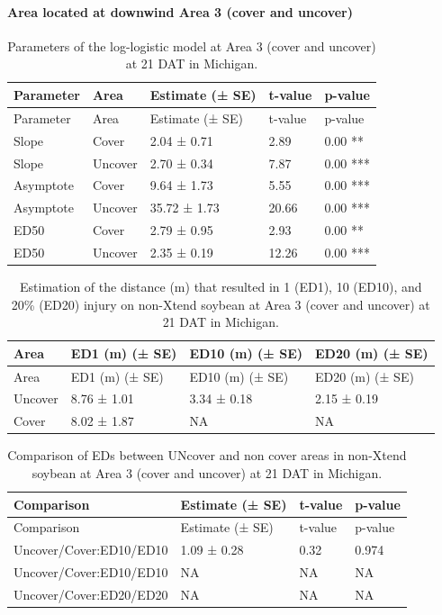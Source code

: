 \documentclass[]{article}
\let\oldparagraph\paragraph
\renewcommand{\paragraph}[1]{\oldparagraph{#1}\mbox{}}
\begin{document}
\newpage

\pagebreak

\paragraph{Area located at downwind Area 3 (cover and
uncover)}\label{area-located-at-downwind-area-3-cover-and-uncover}

\begin{longtable}[]{@{}lllll@{}}
\caption{Parameters of the log-logistic model at Area 3 (cover and
uncover) at 21 DAT in Michigan.}\tabularnewline
\toprule
Parameter & Area & Estimate (± SE) & t-value & p-value\tabularnewline
\midrule
\endfirsthead
\toprule
Parameter & Area & Estimate (± SE) & t-value & p-value\tabularnewline
\midrule
\endhead
Slope & Cover & 2.04 ± 0.71 & 2.89 & 0.00 **\tabularnewline
Slope & Uncover & 2.70 ± 0.34 & 7.87 & 0.00 ***\tabularnewline
Asymptote & Cover & 9.64 ± 1.73 & 5.55 & 0.00 ***\tabularnewline
Asymptote & Uncover & 35.72 ± 1.73 & 20.66 & 0.00 ***\tabularnewline
ED50 & Cover & 2.79 ± 0.95 & 2.93 & 0.00 **\tabularnewline
ED50 & Uncover & 2.35 ± 0.19 & 12.26 & 0.00 ***\tabularnewline
\bottomrule
\end{longtable}

\begin{longtable}[]{@{}llll@{}}
\caption{Estimation of the distance (m) that resulted in 1 (ED1), 10
(ED10), and 20\% (ED20) injury on non-Xtend soybean at Area 3 (cover and
uncover) at 21 DAT in Michigan.}\tabularnewline
\toprule
Area & ED1 (m) (± SE) & ED10 (m) (± SE) & ED20 (m) (± SE)\tabularnewline
\midrule
\endfirsthead
\toprule
Area & ED1 (m) (± SE) & ED10 (m) (± SE) & ED20 (m) (± SE)\tabularnewline
\midrule
\endhead
Uncover & 8.76 ± 1.01 & 3.34 ± 0.18 & 2.15 ± 0.19\tabularnewline
Cover & 8.02 ± 1.87 & NA & NA\tabularnewline
\bottomrule
\end{longtable}

\begin{longtable}[]{@{}llll@{}}
\caption{Comparison of EDs between UNcover and non cover areas in
non-Xtend soybean at Area 3 (cover and uncover) at 21 DAT in
Michigan.}\tabularnewline
\toprule
Comparison & Estimate (± SE) & t-value & p-value\tabularnewline
\midrule
\endfirsthead
\toprule
Comparison & Estimate (± SE) & t-value & p-value\tabularnewline
\midrule
\endhead
Uncover/Cover:ED10/ED10 & 1.09 ± 0.28 & 0.32 & 0.974\tabularnewline
Uncover/Cover:ED10/ED10 & NA & NA & NA\tabularnewline
Uncover/Cover:ED20/ED20 & NA & NA & NA\tabularnewline
\bottomrule
\end{longtable}
\end{document}
